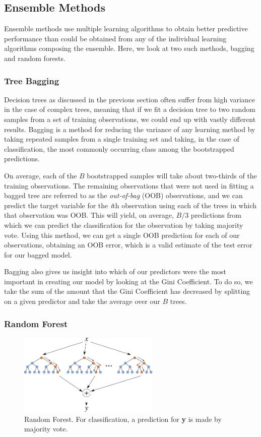 \documentclass[preprint,12pt]{elsarticle}
\begin{document}
\subsection{Ensemble Methods}
Ensemble methods use multiple learning algorithms to obtain better predictive performance than could be obtained from any of the individual learning algorithms composing the ensemble. Here, we look at two such methods, bagging and random forests.


\subsubsection{Tree Bagging}
Decision trees as discussed in the previous section often suffer from high variance in the case of complex trees, meaning that if we fit a decision tree to two random samples from a set of training observations, we could end up with vastly different results. Bagging is a method for reducing the variance of any learning method by taking repeated samples from a single training set and taking, in the case of classification, the most commonly occurring class among the bootstrapped predictions. 

On average, each of the $B$ bootstrapped samples will take about two-thirds of the training observations.  The remaining observations that were not used in fitting a bagged tree are referred to as the \textit{out-of-bag} (OOB) observations, and we can predict the target variable for the \textit{i}th observation using each of the trees in which that observation was OOB. This will yield, on average, $B/3$ predictions from which we can predict the classification for the observation by taking majority vote.\cite{ISLR} Using this method, we can get a single OOB prediction for each of our observations, obtaining an OOB error, which is a valid estimate of the test error for our bagged model.

Bagging also gives us insight into which of our predictors were the most important in creating our model by looking at the Gini Coefficient. To do so, we take the sum of the amount that the Gini Coefficient has decreased by splitting on a given predictor and take the average over our $B$ trees.

\subsubsection{Random Forest}


\begin{figure}[h]
	\centering
	\includegraphics[width=0.6\textwidth]{RF}
	\caption{Random Forest. For classification, a prediction for \textbf{y} is made by majority vote.}
\end{figure}
\end{document}
